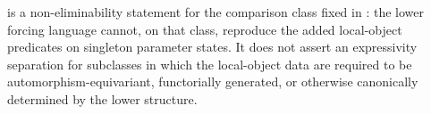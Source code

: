 \begin{remark}
 is a non-eliminability statement for the comparison class fixed in : the lower forcing language cannot, on that class, reproduce the added local-object predicates on singleton parameter states. It does not assert an expressivity separation for subclasses in which the local-object data are required to be automorphism-equivariant, functorially generated, or otherwise canonically determined by the lower structure.
\end{remark}
